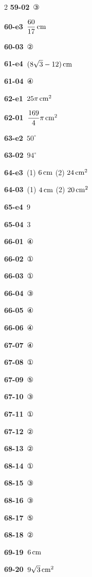 \documentclass[10pt,a4paper]{article}
\begin{document}
\begin{multicols}{2}
\noindent\textbf{59-02}\ ③\par
\noindent\textbf{60-e3}\ $\dfrac{60}{17}\mkern3mu \mathrm{cm}$\par
\noindent\textbf{60-03}\ ②\par
\noindent\textbf{61-e4}\ $(8\sqrt{3}-12)\mkern3mu \mathrm{cm}$\par
\noindent\textbf{61-04}\ ④\par
\noindent\textbf{62-e1}\ $25\pi\mkern3mu \mathrm{cm}^2$\par
\noindent\textbf{62-01}\ $\dfrac{169}{4}\pi\mkern3mu \mathrm{cm}^2$\par
\noindent\textbf{63-e2}\ $50^\circ$\par
\noindent\textbf{63-02}\ $94^\circ$\par
\noindent\textbf{64-e3}\ (1) $6\mkern3mu \mathrm{cm}$ (2) $24\mkern3mu \mathrm{cm}^2$\par
\noindent\textbf{64-03}\ (1) $4\mkern3mu \mathrm{cm}$ (2) $20\mkern3mu \mathrm{cm}^2$\par
\noindent\textbf{65-e4}\ $9$\par
\noindent\textbf{65-04}\ $3$\par
\noindent\textbf{66-01}\ ④\par
\noindent\textbf{66-02}\ ①\par
\noindent\textbf{66-03}\ ①\par
\noindent\textbf{66-04}\ ③\par
\noindent\textbf{66-05}\ ④\par
\noindent\textbf{66-06}\ ④\par
\noindent\textbf{67-07}\ ④\par
\noindent\textbf{67-08}\ ①\par
\noindent\textbf{67-09}\ ⑤\par
\noindent\textbf{67-10}\ ③\par
\noindent\textbf{67-11}\ ①\par
\noindent\textbf{67-12}\ ②\par
\noindent\textbf{68-13}\ ②\par
\noindent\textbf{68-14}\ ①\par
\noindent\textbf{68-15}\ ③\par
\noindent\textbf{68-16}\ ③\par
\noindent\textbf{68-17}\ ⑤\par
\noindent\textbf{68-18}\ ②\par
\noindent\textbf{69-19}\ $6\mkern3mu \mathrm{cm}$\par
\noindent\textbf{69-20}\ $9\sqrt{3}\mkern3mu \mathrm{cm}^2$\par

\end{multicols}
\end{document}
